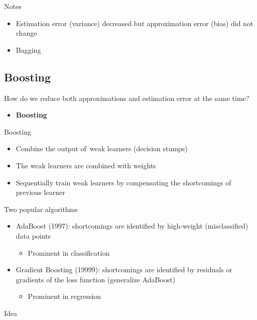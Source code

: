 \documentclass[10pt, oneside]{article}
\begin{document}
Notes
\begin{itemize}
    \item Estimation error (variance) decreased but approximation error (bias) did not change
    \item Bagging
\end{itemize}

\subsection{Boosting}
How do we reduce both approximations and estimation error at the same time?
\begin{itemize}
    \item \textbf{Boosting}
\end{itemize}
Boosting
\begin{itemize}
    \item Combine the output of weak learners (decision stumps)
    \item The weak learners are combined with weights
    \item Sequentially train weak learners by compensating the shortcomings of previous learner
\end{itemize}
Two popular algorithms
\begin{itemize}
    \item AdaBoost (1997): shortcomings are identified by high-weight (misclassified) data points
    \begin{itemize}
        \item Prominent in classification
    \end{itemize}
    \item Gradient Boosting (19999): shortcomings are identified by residuals or gradients of the loss function (generalize AdaBoost)
    \begin{itemize}
        \item Prominent in regression
    \end{itemize}
\end{itemize}
Idea
\end{document}
